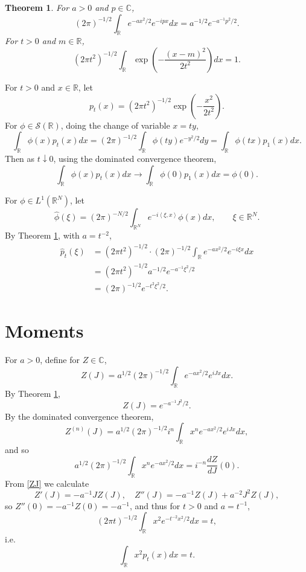 \documentclass{article}
\newcommand{\inner}[2]{\left\langle #1, #2 \right\rangle}
\newtheorem{theorem}{Theorem}
\theoremstyle{definition}
\begin{document}
\begin{theorem}
For $a > 0$ and $p \in \mathbb{C}$,
\[
(2\pi)^{-1/2} \int_{\mathbb{R}} e^{-ax^2/2} e^{-ipx} dx = a^{-1/2} e^{-a^{-1} p^2 /2}.
\]
For $t>0$ and $m \in \mathbb{R}$,
\[
(2\pi t^2)^{-1/2} \int_{\mathbb{R}} \exp\left(-\frac{(x-m)^2}{2t^2}\right) dx = 1.
\]
\label{gaussian1d}
\end{theorem}

For $t>0$ and $x \in \mathbb{R}$, let
\[
p_t(x) = (2\pi t^2)^{-1/2} \exp\left( - \frac{x^2}{2t^2}\right).
\]
For $\phi \in \mathscr{S}(\mathbb{R})$,
doing the change of variable $x=ty$,
\[
\int_{\mathbb{R}} \phi(x) p_t(x) dx = (2\pi)^{-1/2} \int_{\mathbb{R}} \phi(ty) e^{-y^2/2} dy
=\int_{\mathbb{R}} \phi(tx) p_1(x) dx.
\]
Then as $t \downarrow 0$, using the dominated convergence theorem,
\[
\int_{\mathbb{R}} \phi(x) p_t(x) dx \to \int_{\mathbb{R}} \phi(0) p_1(x) dx = \phi(0).
\]

For $\phi \in L^1(\mathbb{R}^N)$, let
\[
\widehat{\phi}(\xi) = (2\pi)^{-N/2} \int_{\mathbb{R}^N} e^{-i\inner{\xi}{x}} \phi(x) dx,\qquad
\xi \in \mathbb{R}^N.
\]
By Theorem \ref{gaussian1d}, with $a=t^{-2}$,
\begin{align*}
\widehat{p}_t(\xi) &= (2\pi t^2)^{-1/2} \cdot (2\pi)^{-1/2}  \int_{\mathbb{R}} e^{-ax^2/2} e^{-i\xi x}  dx\\
&=(2\pi t^2)^{-1/2} a^{-1/2} e^{-a^{-1} \xi^2/2}\\
&=(2\pi)^{-1/2} e^{-t^2 \xi^2/2}.
\end{align*}



\section{Moments}
For $a>0$, define for $Z \in \mathbb{C}$,
\[
Z(J) = a^{1/2} (2\pi)^{-1/2} \int_{\mathbb{R}} e^{-ax^2/2} e^{iJx} dx.
\]
By Theorem \ref{gaussian1d},
\begin{equation}
Z(J) = e^{-a^{-1} J^2/2}.
\label{ZJ}
\end{equation}
By the dominated convergence theorem,
\[
Z^{(n)}(J) = a^{1/2} (2\pi)^{-1/2} i^n  \int_{\mathbb{R}} x^n e^{-ax^2/2} e^{iJx} dx,
\]
and so 
\[
a^{1/2} (2\pi)^{-1/2} \int_{\mathbb{R}} x^n e^{-ax^2/2} dx = i^{-n} \frac{dZ}{dJ}(0).
\]
From \eqref{ZJ} 
we calculate
\[
Z'(J) = -a^{-1}J Z(J),
\quad Z''(J) = -a^{-1} Z(J) + a^{-2} J^2 Z(J),
\]
so $Z''(0)=-a^{-1} Z(0) = -a^{-1}$, and thus for $t>0$ and $a=t^{-1}$,
\[
(2\pi t)^{-1/2} \int_{\mathbb{R}} x^2 e^{-t^{-2} x^2/2} dx = t,
\]
i.e.
\[
\int_{\mathbb{R}} x^2 p_t(x) dx = t.
\]
\end{document}
